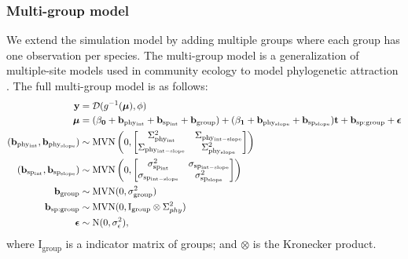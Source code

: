 \documentclass[12pt]{article}
\begin{document}
\subsubsection*{Multi-group model}

We extend the simulation model by adding multiple groups where each group has one observation per species. 
The multi-group model is a generalization of multiple-site models used in community ecology to model phylogenetic attraction \citep{helmus2007separating}. 
The full multi-group model is as follows: 
\begin{equation}
\begin{aligned}
{\mathbf y} & = {\cal D}(g^{-1}({\boldsymbol \mu}), \phi) \\
{\boldsymbol \mu} & = (\bf{\beta_0 + b_{\mathrm{phy_{int}}} + b_{\mathrm{sp_{int}}} + b_{\mathrm{group}}}) + (\bf{\beta_1 + b_{\mathrm{phy_{slope}}} + b_{\mathrm{sp_{slope}}}}) \bm{t} + \bf{b_{\mathrm{sp:group}}} + {\boldsymbol \epsilon} \\
(\bf{b_{\mathrm{phy_{int}}}, b_{\mathrm{phy_{slope}}}}) & \sim \textrm{MVN} \left( 0, \begin{bmatrix}
\Sigma^2_{\mathrm{phy_{int}}} & \Sigma_{\mathrm{phy_{int-slope}}} \\ 
\Sigma_{\mathrm{phy_{int-slope}}} & \Sigma^2_{\mathrm{phy_{slope}}}
\end{bmatrix}
\right) \\
(\bf{b_{\mathrm{sp_{int}}}, b_{\mathrm{sp_{slope}}}}) & \sim \textrm{MVN} \left( 0, \begin{bmatrix}
\sigma^2_{\mathrm{sp_{int}}} & \sigma_{\mathrm{sp_{int-slope}}} \\ 
\sigma_{\mathrm{sp_{int-slope}}} & \sigma^2_{\mathrm{sp_{slope}}}
\end{bmatrix}
\right) \\
\bf{b_{\mathrm{group}}} & \sim \textrm{MVN} ( 0 , \sigma^2_{\mathrm{group}}) \\
\bf{b_{\mathrm{sp:group}}} & \sim \textrm{MVN} (0, \mathrm{I}_{\mathrm{group}} \otimes \Sigma^2_{phy}) \\
{\boldsymbol \epsilon} & \sim \textrm{N} ( 0 , \sigma_{\epsilon}^2),
\label{eq:multiple_glmm}
\end{aligned}
\end{equation}
where $\textrm{I}_{\textrm{group}}$ is a indicator matrix of groups; and $\otimes$ is the Kronecker product.
\end{document}
